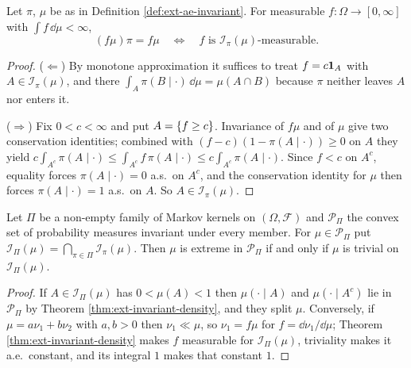 \begin{theorem}
    \label{thm:ext-invariant-density}
    \leanok

    Let $\pi$, $\mu$ be as in Definition \ref{def:ext-ae-invariant}. For measurable
    $f : \Omega \to [0,\infty]$ with $\int f \,\dd\mu < \infty$,
    \[(f\mu)\pi = f\mu \quad\Longleftrightarrow\quad f \text{ is } \mathcal I_\pi(\mu)\text{-measurable}.\]
\end{theorem}
\begin{proof}
    \leanok

    ($\Leftarrow$) By monotone approximation it suffices to treat $f = c\mathbf{1}_A$ with
    $A \in \mathcal I_\pi(\mu)$, and there $\int_A \pi(B \mid \cdot)\,\dd\mu = \mu(A \cap B)$
    because $\pi$ neither leaves $A$ nor enters it.

    ($\Rightarrow$) Fix $0 < c < \infty$ and put $A = \left\{ f \geq c \right\}$. Invariance of $f\mu$ and of
    $\mu$ give two conservation identities; combined with $(f - c)(1 - \pi(A\mid\cdot)) \geq 0$
    on $A$ they yield
    $c\int_{A^c} \pi(A\mid\cdot) \leq \int_{A^c} f\,\pi(A\mid\cdot) \leq c\int_{A^c}\pi(A\mid\cdot)$.
    Since $f < c$ on $A^c$, equality forces $\pi(A \mid \cdot) = 0$ a.s.\ on $A^c$, and the
    conservation identity for $\mu$ then forces $\pi(A\mid\cdot) = 1$ a.s.\ on $A$. So
    $A \in \mathcal I_\pi(\mu)$.
\end{proof}

\begin{theorem}
    \label{thm:ext-74}
    \leanok

    Let $\Pi$ be a non-empty family of Markov kernels on $(\Omega,\mathcal F)$ and $\mathcal P_\Pi$
    the convex set of probability measures invariant under every member. For $\mu \in \mathcal
    P_\Pi$ put $\mathcal I_\Pi(\mu) = \bigcap_{\pi \in \Pi} \mathcal I_\pi(\mu)$. Then $\mu$ is
    extreme in $\mathcal P_\Pi$ if and only if $\mu$ is trivial on $\mathcal I_\Pi(\mu)$.
\end{theorem}
\begin{proof}
    \leanok

    If $A \in \mathcal I_\Pi(\mu)$ has $0 < \mu(A) < 1$ then $\mu(\cdot \mid A)$ and
    $\mu(\cdot \mid A^c)$ lie in $\mathcal P_\Pi$ by Theorem \ref{thm:ext-invariant-density}, and
    they split $\mu$. Conversely, if $\mu = a\nu_1 + b\nu_2$ with $a,b>0$ then $\nu_1 \ll \mu$, so
    $\nu_1 = f\mu$ for $f = \dd\nu_1/\dd\mu$; Theorem \ref{thm:ext-invariant-density} makes $f$
    measurable for $\mathcal I_\Pi(\mu)$, triviality makes it a.e.\ constant, and its integral $1$
    makes that constant $1$.
\end{proof}

